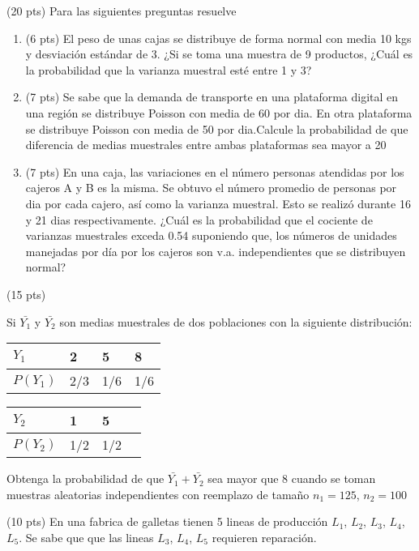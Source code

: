 \documentclass[addpoints]{exam}
\theoremstyle{mytheor}
\begin{document}
  \begin{questions} 

  \question (20 pts)
  Para las siguientes preguntas resuelve 
  \begin{enumerate}
  \item (6 pts) El peso de unas cajas se distribuye de forma normal con media 10 kgs y desviación estándar de 3. ¿Si se toma una muestra de 9 productos, ¿Cuál es la probabilidad que la varianza  muestral esté entre 1 y 3?
  \item (7 pts) Se sabe que la demanda de transporte en una plataforma digital en una región se distribuye Poisson con media de 60 por dia. En otra plataforma se distribuye Poisson con media de 50 por dia.Calcule la probabilidad de que diferencia de medias muestrales entre ambas plataformas sea mayor a 20
  \item (7 pts) En una caja, las variaciones en el número personas atendidas por los cajeros A y B es la misma. Se obtuvo el número promedio de personas por dia por cada cajero, así como la varianza muestral. Esto se realizó durante 16 y 21 dias respectivamente. ¿Cuál es la probabilidad que el cociente de varianzas muestrales exceda 0.54 suponiendo que, los números de unidades manejadas por día por los cajeros son v.a. independientes que se distribuyen normal?
  \end{enumerate}

\question (15 pts) 

Si $\bar{Y_1}$ y $\bar{Y_2}$ son medias muestrales de dos poblaciones con la siguiente distribución:

\begin{table}[h]
\centering
\begin{tabular}{llll}
$Y_1$ & 2 & 5 & 8 \\ \hline
$P(Y_1)$ & 2/3 & 1/6 & 1/6 
\end{tabular}
\end{table}

\begin{table}[h]
\centering
\begin{tabular}{llll}
$Y_2$ & 1 & 5 \\ \hline
$P(Y_2)$ & 1/2 & 1/2
\end{tabular}
\end{table}

Obtenga la probabilidad de que $\bar{Y_1} + \bar{Y_2}$ sea mayor que 8 cuando se toman muestras aleatorias independientes con reemplazo de tamaño $n_1 = 125$, $n_2 = 100$

 \question (10 pts) En una fabrica de galletas tienen 5 lineas de producción $L_1$, $L_2$, $L_3$, $L_4$, $L_5$. Se sabe que que las lineas $L_3$, $L_4$, $L_5$ requieren reparación.


\end{questions}
\end{document}
